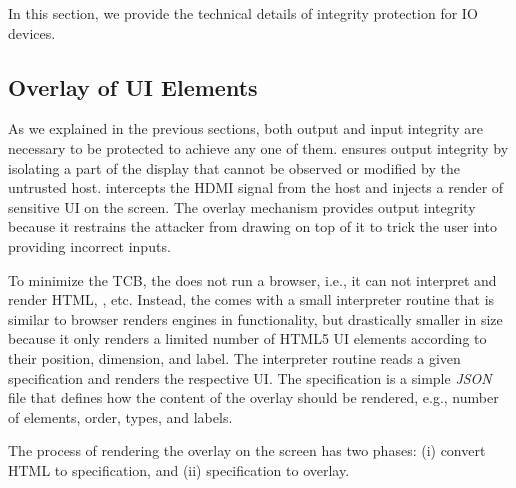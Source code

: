 In this section, we provide the technical details of \name integrity protection for IO devices. 



\subsection{\device Overlay of UI Elements}
\label{sec:systemDesign:transformation}

As we explained in the previous sections, both output and input integrity are necessary to be protected to achieve any one of them. \name ensures output integrity by isolating a part of the display that cannot be observed or modified by the untrusted host. \device intercepts the HDMI signal from the host and injects a render of sensitive UI on the screen. The overlay mechanism provides output integrity because it restrains the attacker from drawing on top of it to trick the user into providing incorrect inputs. 

To minimize the TCB, the \device does not run a browser, i.e., it can not interpret and render HTML, \js, etc. Instead, the \device comes with a small interpreter routine that is similar to browser renders engines in functionality, but drastically smaller in size because it only renders a limited number of HTML5 UI elements according to their position, dimension, and label. The interpreter routine reads a given specification and renders the respective UI. The specification is a simple \emph{JSON} file that defines how the content of the overlay should be rendered, e.g., number of elements, order, types, and labels. 

The process of rendering the overlay on the screen has two phases: (i) convert HTML to specification, and (ii) specification to overlay.

